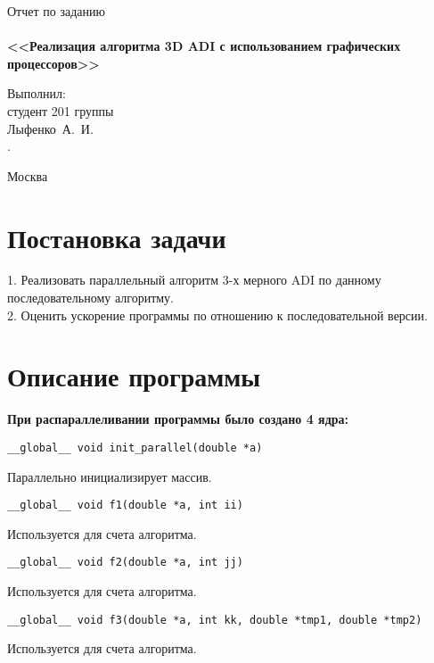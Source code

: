 \documentclass[a4paper,12pt,titlepage,draft]{article}
\begin{document}
\begin{titlepage}
    \begin{center}
	{\Large \sc Отчет по заданию}\\
	~\\
	{\large \bf <<Реализация алгоритма 3D ADI с использованием графических процессоров>>}\\ 
    \end{center}
    \begin{flushright}
	\vfill {Выполнил:\\
	студент 201 группы\\
	Лыфенко~А.~И.\\.}
    \end{flushright}
    \begin{center}
	\vfill
	{\small Москва\\ \the\year{}}
    \end{center}
\end{titlepage}

\section{Постановка задачи}
1. Реализовать параллельный алгоритм 3-х мерного ADI по данному последовательному алгоритму.\\

2. Оценить ускорение программы по отношению к последовательной версии.\\
\newpage
\section{Описание программы}
\textbf{При распараллеливании программы было создано 4 ядра:}\\
\begin{verbatim}
__global__ void init_parallel(double *a)
\end{verbatim}
Параллельно инициализирует массив.\\
\begin{verbatim}
__global__ void f1(double *a, int ii)
\end{verbatim}
Используется для счета алгоритма.
\begin{verbatim}
__global__ void f2(double *a, int jj)
\end{verbatim}
Используется для счета алгоритма.
\begin{verbatim}
__global__ void f3(double *a, int kk, double *tmp1, double *tmp2)
\end{verbatim}
Используется для счета алгоритма.\\
\end{document}
